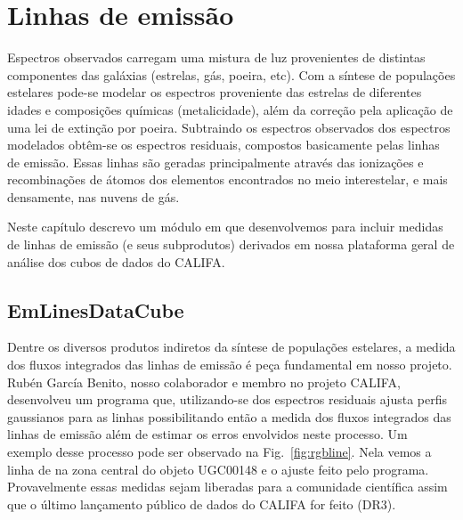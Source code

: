 


\chapter{Linhas de emissão}
\label{sec:emlines}

Espectros observados carregam uma mistura de luz provenientes de distintas componentes das galáxias (estrelas, gás, poeira, etc). Com a síntese de populações estelares pode-se modelar os espectros proveniente das estrelas de diferentes idades e composições químicas (metalicidade), além da correção pela aplicação de uma lei de extinção por poeira. Subtraindo os espectros observados dos espectros modelados obtêm-se os espectros residuais, compostos basicamente pelas linhas de emissão. Essas linhas são geradas principalmente através das ionizações e recombinações de átomos dos elementos encontrados no meio interestelar, e mais densamente, nas nuvens de gás. 


Neste capítulo
descrevo um módulo em \pyt que desenvolvemos para incluir medidas de linhas de emissão (e seus
subprodutos) derivados em nossa plataforma geral de análise dos cubos de dados do CALIFA.

\section{EmLinesDataCube}
\label{sec:emline:datacube}

Dentre os diversos produtos indiretos da síntese de populações estelares, a medida dos fluxos
integrados das linhas de emissão é peça fundamental em nosso projeto. Rubén García Benito, nosso
colaborador e membro no projeto CALIFA, desenvolveu um programa que, utilizando-se dos espectros
residuais  ajusta perfis gaussianos para as linhas possibilitando então a medida dos fluxos
integrados das linhas de emissão além de estimar os erros envolvidos neste processo. Um exemplo
desse processo pode ser observado na Fig.\ \ref{fig:rgbline}. Nela vemos a linha de \Hbeta na zona
central do objeto UGC00148 e o ajuste feito pelo programa. Provavelmente essas medidas sejam
liberadas para a comunidade científica assim que o último lançamento público de dados do CALIFA for
feito (DR3).

